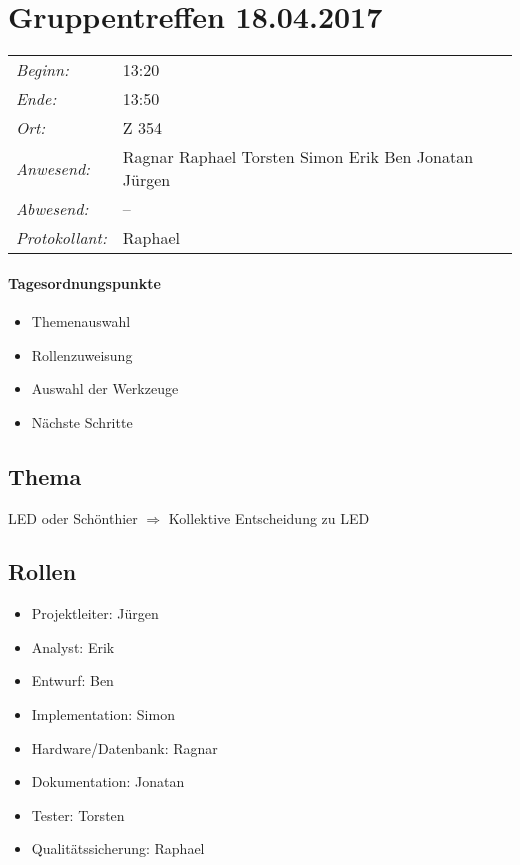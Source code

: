 \documentclass{scrartcl}
\date{18.04.2017}
\begin{document}
\maketitle
\section{Gruppentreffen 18.04.2017}
\begin{tabular}[t]{p{.25\linewidth} p{.25\linewidth}}
\emph{Beginn:}				& 13:20\\
\emph{Ende:}					& 13:50\\
\emph{Ort:}						& Z 354\\
\emph{Anwesend:}	& 
Ragnar\newline
Raphael\newline
Torsten\newline
Simon\newline
Erik\newline
Ben\newline
Jonatan\newline
Jürgen
\\
\emph{Abwesend:}		 & 
--
\\
\emph{Protokollant:}& Raphael
\end{tabular}
\paragraph{Tagesordnungspunkte}
\begin{itemize}
\item Themenauswahl
\item Rollenzuweisung
\item Auswahl der Werkzeuge
\item Nächste Schritte
\end{itemize}

\subsection{Thema}
LED oder Schönthier $\Rightarrow$ Kollektive Entscheidung zu LED
\subsection{Rollen}
\begin{itemize}
\item Projektleiter: Jürgen
\item Analyst: Erik
\item Entwurf: Ben
\item Implementation: Simon
\item Hardware/Datenbank: Ragnar 
\item Dokumentation: Jonatan
\item Tester: Torsten
\item Qualitätssicherung: Raphael 
\end{itemize}
\end{document}
